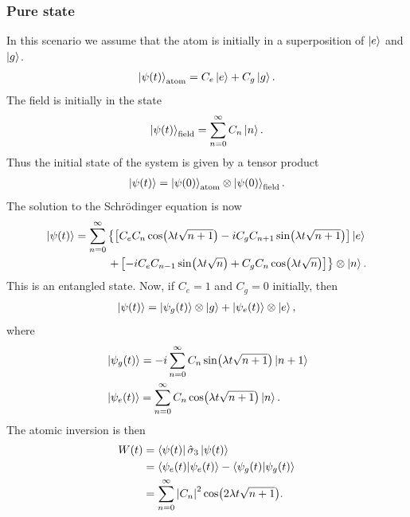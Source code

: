 \documentclass{book}
\theoremstyle{definition}
\newcommand{\lb}{\left[}
\newcommand{\rb}{\right]}
\newcommand{\lc}{\left\{}
\newcommand{\rc}{\right\}}
\begin{document}
\subsubsection{Pure state}
In this scenario we assume that the atom is initially in a superposition of $\ket{e}$ and $\ket{g}$. 
\begin{align}
\ket{\psi(t)}_\text{atom} =C_e\ket{e} + C_g\ket{g}.
\end{align}
The field is initially in the state
\begin{align}
\ket{\psi(t)}_\text{field} = \sum_{n=0}^\infty C_n\ket{n}.
\end{align}
Thus the initial state of the system is given by a tensor product
\begin{align}
\ket{\psi(t)} = \ket{\psi(0)}_\text{atom} \otimes \ket{\psi(0)}_\text{field}.
\end{align}
The solution to the Schr\"{o}dinger equation is now
\begin{align}
\ket{\psi(t)} = \sum^\infty_{n=0}\lc \lb C_e C_n \cos (\lambda t \sqrt{n+1}) - iC_gC_{n+1}\sin(\lambda t \sqrt{n+1}) \rb \ket{e} \right. \nonumber \\  \left.
+ \lb -iC_eC_{n-1}\sin(\lambda t \sqrt{n}) + C_gC_n \cos(\lambda t \sqrt{n}) \rb 
 \rc \otimes \ket{n}.
\end{align}
This is an entangled state. Now, if $C_e = 1$ and $C_g = 0$ initially, then
\begin{align}
\ket{\psi(t)} = \ket{\psi_g(t)}\otimes \ket{g} + \ket{\psi_e(t)}\otimes \ket{e},
\end{align}
where
\begin{align}
&\ket{\psi_g(t)} = -i\sum^\infty_{n=0}C_n\sin(\lambda t \sqrt{n+1})\ket{n+1}\\
&\ket{\psi_e(t)} = \sum^\infty_{n=0}C_n\cos(\lambda t \sqrt{n+1})\ket{n}.
\end{align}
The atomic inversion is then
\begin{align}
W(t) &= \bra{\psi(t)}\hat{\sigma}_3\ket{\psi(t)}\\
&= \braket{\psi_e(t)} - \braket{\psi_g(t)}\\
&= \sum^\infty_{n=0}\abs{C_n}^2 \cos(2\lambda t\sqrt{n+1}).
\end{align}
\end{document}
